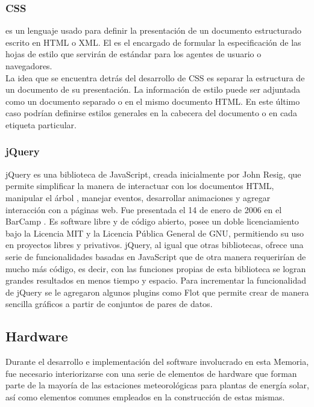 \subsubsection{CSS}
 es un lenguaje usado para definir la presentación de un documento estructurado escrito en HTML o XML. El  es el encargado de formular la especificación de las hojas de estilo que servirán de estándar para los agentes de usuario o navegadores.\\
La idea que se encuentra detrás del desarrollo de CSS es separar la estructura de un documento de su presentación. La información de estilo puede ser adjuntada como un documento separado o en el mismo documento HTML. En este último caso podrían definirse estilos generales en la cabecera del documento o en cada etiqueta particular.

\subsubsection{jQuery}
jQuery\cite{software:jquery} es una biblioteca de JavaScript, creada inicialmente por John Resig, que permite simplificar la manera de interactuar con los documentos HTML, manipular el árbol , manejar eventos, desarrollar animaciones y agregar interacción con  a páginas web. Fue presentada el 14 de enero de 2006 en el BarCamp . Es software libre y de código abierto, posee un doble licenciamiento bajo la Licencia MIT\cite{licencia:mit} y la Licencia Pública General de GNU\cite{licencia:gnu}, permitiendo su uso en proyectos libres y privativos. jQuery, al igual que otras bibliotecas, ofrece una serie de funcionalidades basadas en JavaScript que de otra manera requerirían de mucho más código, es decir, con las funciones propias de esta biblioteca se logran grandes resultados en menos tiempo y espacio.
Para incrementar la funcionalidad de jQuery se le agregaron algunos plugins como Flot\cite{software:flot} que permite crear de manera sencilla gráficos a partir de conjuntos de pares de datos.

\subsection{Hardware}
Durante el desarrollo e implementación del software involucrado en esta Memoria, fue necesario interiorizarse con una serie de elementos de hardware que forman parte de la mayoría de las estaciones meteorológicas para plantas de energía solar, así como elementos comunes empleados en la construcción de estas mismas.

